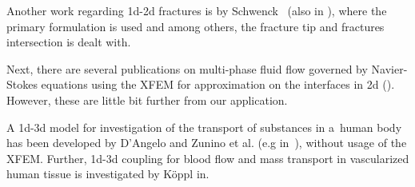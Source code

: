 Another work regarding 1d-2d fractures is by Schwenck~\cite{schwenck_xfem-based_2015} (also in \cite{schwenck_2015}), 
where the primary formulation is used and among others, the fracture tip and fractures intersection is dealt with.

Next, there are several publications on multi-phase fluid flow governed by Navier-Stokes equations using the XFEM for
approximation on the interfaces in 2d (\cite{diez_stable_2013,sauerland_stable_2013}). However, these are
little bit further from our application.

A 1d-3d model for investigation of the transport of substances in a~human body has been developed by D'Angelo 
and Zunino et al. (e.g in~\cite{dangelo_coupling_2008,cattaneo_numerical_2015}), without usage of the XFEM.
Further, 1d-3d coupling for blood flow and mass transport in vascularized human tissue is
investigated by K{\" o}ppl in\cite{koppl_tum_2015}.
